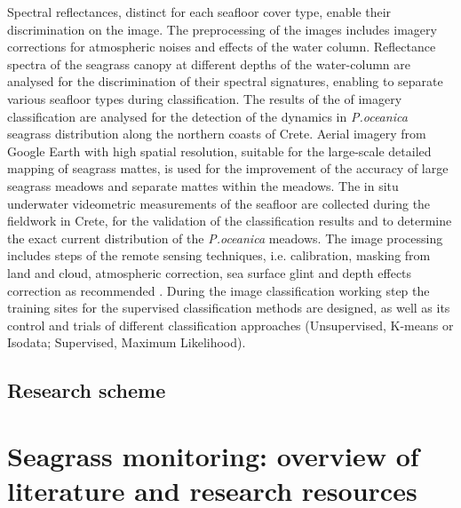 \documentclass[10pt, a4paper]{article}
\begin{document}
Spectral reflectances, distinct for each seafloor cover type, enable their discrimination on the image. The preprocessing
of the images includes imagery corrections for atmospheric noises and effects of the water
column. Reflectance spectra of the seagrass canopy at different depths of the water-column are
analysed for the discrimination of their spectral signatures, enabling to separate various seafloor types
during classification. The results of the of imagery classification are analysed for the detection of the
dynamics in \textit{P.oceanica} seagrass distribution along the northern coasts of Crete. Aerial imagery from
Google Earth with high spatial resolution, suitable for the large-scale detailed mapping of seagrass
mattes, is used for the improvement of the accuracy of large seagrass meadows and separate mattes
within the meadows. The in situ underwater videometric measurements of the seafloor are collected
during the fieldwork in Crete, for the validation of the classification results and to determine the exact
current distribution of the \textit{P.oceanica} meadows. The image processing includes steps of the remote
sensing techniques, i.e. calibration, masking from land and cloud, atmospheric correction, sea surface
glint and depth effects correction as recommended \cite{Matarrese08}\label{Matarrese08}. During the image classification
working step the training sites for the supervised classification methods are designed, as well as its
control and trials of different classification approaches (Unsupervised, K-means or Isodata;
Supervised, Maximum Likelihood).

\subsection{Research scheme}

\pagebreak

\section[Overview of literature]{Seagrass monitoring: overview of literature and research resources} \label{sec:2}
\end{document}
